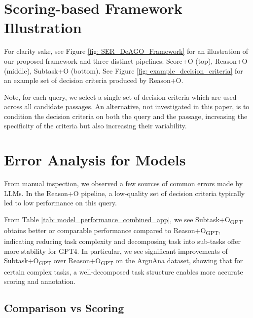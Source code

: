 \documentclass[11pt]{article}
\begin{document}
\section{Scoring-based Framework Illustration}
\label{sec: appendix_framework_illustration}

For clarity sake, see Figure \ref{fig: SER_DeAGO_Framework} for an illustration of our proposed framework and three distinct pipelines: Score+O (top), Reason+O (middle), Subtask+O (bottom). See Figure \ref{fig: example_decision_criteria} for an example set of decision criteria produced by Reason+O.

Note, for each query, we select a single set of decision criteria which are used across all candidate passages. An alternative, not investigated in this paper, is to condition the decision criteria on both the query and the passage, increasing the specificity of the criteria but also increasing their variability. 

\section{Error Analysis for Models}
\label{sec: appendix_error analysis for models}

From manual inspection, we observed a few sources of common errors made by LLMs. In the Reason+O pipeline, a low-quality set of decision criteria typically led to low performance on this query. %

From Table \ref{tab: model_performance_combined_app}, we see Subtask+O\textsubscript{\scriptsize{GPT}} obtains better or comparable performance compared to Reason+O\textsubscript{\scriptsize{GPT}}, indicating reducing task complexity and decomposing task into sub-tasks offer more stability for GPT4. In particular, we see significant improvements of Subtask+O\textsubscript{\scriptsize{GPT}} over Reason+O\textsubscript{\scriptsize{GPT}} on the ArguAna dataset, showing that for certain complex tasks, a well-decomposed task structure enables more accurate scoring and annotation.

\subsection{Comparison vs Scoring}
\end{document}
